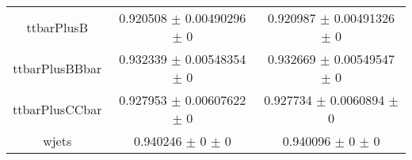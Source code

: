 \begin{table}
\begin{tabular}{ccc}
ttbarPlusB & \num{0.920508} $\pm$ \num{0.00490296} $\pm$ \num{0} & \num{0.920987} $\pm$ \num{0.00491326} $\pm$ \num{0}\\
ttbarPlusBBbar & \num{0.932339} $\pm$ \num{0.00548354} $\pm$ \num{0} & \num{0.932669} $\pm$ \num{0.00549547} $\pm$ \num{0}\\
ttbarPlusCCbar & \num{0.927953} $\pm$ \num{0.00607622} $\pm$ \num{0} & \num{0.927734} $\pm$ \num{0.0060894} $\pm$ \num{0}\\
wjets & \num{0.940246} $\pm$ \num{0} $\pm$ \num{0} & \num{0.940096} $\pm$ \num{0} $\pm$ \num{0}\\
\bottomrule
\end{tabular}
\end{table}